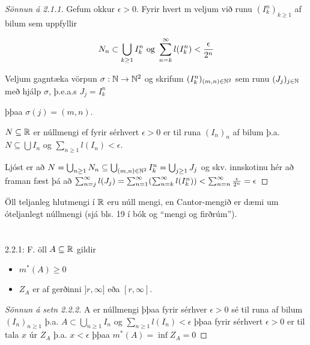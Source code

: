 \documentclass[12pt]{book}
\begin{document}
\begin{proof}[Sönnun á 2.1.1]

Gefum okkur $\epsilon > 0$. Fyrir hvert m veljum við runu $(I^n_k)_{k \geq 1}$ af bilum sem uppfyllir

\[N_n \subset \bigcup_{k \geq 1} I_k^n \text{ og } \sum_{n = {k}}^{\infty} l(I^n_k) < \frac{\epsilon}{2^n}\]

Veljum gagntæka vörpun $\sigma: \mathbb{N} \to \mathbb{N}^2$ og skrifum $(I^n_k)_{(m,n) \in \mathbb{N}^2}$ sem runu
$(J_j)_{j \in \mathbb{N}}$ með hjálp $\sigma$, þ.e.a.s $J_j = I^n_k$

þþaa $\sigma (j) = (m,n)$.

\begin{ath}
$N \subseteq \mathbb{R}$ er núllmengi ef fyrir sérhvert $\epsilon > 0$ er til runa $(I_n)_{n}$ af bilum þ.a.
$N \subseteq \bigcup I_n$ og $\sum_{n \geq 1} l(I_n) < \epsilon$.

\end{ath}

Ljóst er að $N = \bigcup_{n \geq 1} N_n \subseteq \bigcup_{(m,n) \in \mathbb{N}^2} I^n_k = \bigcup_{j \geq 1} J_j$
og skv. innskotinu hér að framan fæst þá að
$\sum_{n = {j}}^{\infty} l(J_j) = \sum_{n = 1}^{\infty} ( \sum_{n = {k}}^{\infty} l(I_k^n)) < \sum_{n = {n}}^{\infty} \frac{\epsilon}{2^n} = \epsilon$

\end{proof}

\begin{daemi}

Öll teljanleg hlutmengi í $\mathbb{R}$ eru núll mengi, en Cantor-mengið er dæmi um óteljanlegt núllmengi (sjá bls. 19 í bók og ``mengi og firðrúm'').
\end{daemi}


\section{}
\begin{ath}2.2.1:
F. öll $A \subseteq \mathbb{R}$ gildir
\begin{itemize}
\item $m^*(A) \geq 0$
\item $Z_A$ er af gerðinni $]r, \infty]$ eða $[r,\infty]$.
\end{itemize}
\end{ath}
\begin{proof}[Sönnun á setn 2.2.2]
A er núllmengi þþaa fyrir sérhver $\epsilon > 0$ sé til runa af bilum $(I_n)_{n \geq 1}$ þ.a. $A \subset \bigcup_{n \geq 1} I_n$ og $\sum_{n \geq 1} l(I_n) < \epsilon$ þþaa
fyrir sérhvert $\epsilon > 0$ er til tala $x$ úr $Z_A$ þ.a. $x < \epsilon$ þþaa $m^*(A) = \inf{Z_A} = 0$
\end{proof}
\end{document}
